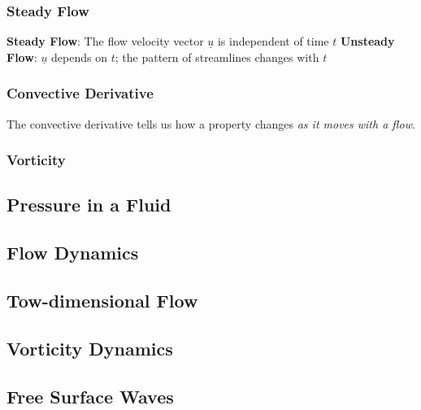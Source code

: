 \subsubsection{Steady Flow}

\textbf{Steady Flow}: The flow velocity vector $\underline{u}$ is independent of time $t$
\newline
\textbf{Unsteady Flow}: $\underline{u}$ depends on $t$; the pattern of streamlines changes with $t$
\subsubsection{Convective Derivative}
The convective derivative tells us how a property changes \textit{as it moves with a flow}.

\subsubsection{Vorticity}

\subsection{Pressure in a Fluid}
\subsection{Flow Dynamics}
\subsection{Tow-dimensional Flow}
\subsection{Vorticity Dynamics}
\subsection{Free Surface Waves}